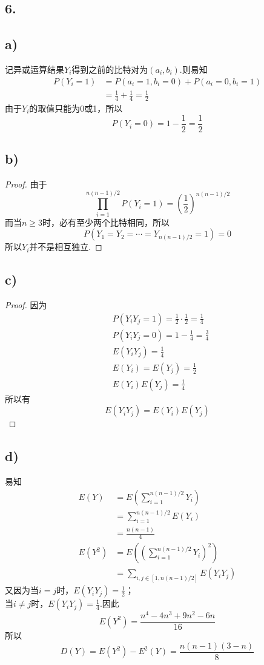 \documentclass[twocolumn]{article}
\begin{document}
\begin{CJK}{UTF8}{gbsn}
			\section*{6.}
			\subsection*{a)}
				记异或运算结果$Y_i$得到之前的比特对为$(a_i,b_i)$.则易知\begin{align*}
					P(Y_i=1) & = P(a_i=1,b_i=0)+P(a_i=0,b_i=1)\\
					& = \frac{1}{4}+\frac{1}{4}=\frac{1}{2}
				\end{align*}
				由于$Y_i$的取值只能为0或1，所以\[P(Y_i=0)=1-\frac{1}{2}=\frac{1}{2} \]
			\subsection*{b)}
				\begin{proof}
					由于\[\prod_{i=1}^{n(n-1)/2}P(Y_i=1)=(\frac{1}{2})^{n(n-1)/2}\]而当$n\ge3$时，必有至少两个比特相同，所以\[P(Y_1=Y_2=\cdots=Y_{n(n-1)/2}=1)=0\]所以$Y_i$并不是相互独立.
				\end{proof}
			\subsection*{c)}
				\begin{proof}
					因为\begin{align*}
						& P(Y_iY_j=1)=\frac{1}{2}\cdot\frac{1}{2}=\frac{1}{4}\\
						& P(Y_iY_j=0)=1-\frac{1}{4}=\frac{3}{4}\\
						& E(Y_iY_j)=\frac{1}{4}\\
						& E(Y_i)=E(Y_j)=\frac{1}{2}\\
						& E(Y_i)E(Y_j)=\frac{1}{4}
					\end{align*}
					所以有\[E(Y_iY_j)=E(Y_i)E(Y_j)\]
				\end{proof}
			\subsection*{d)}
				易知\begin{align*}
					E(Y) & = E(\sum_{i=1}^{n(n-1)/2}Y_i) \\
					& = \sum_{i=1}^{n(n-1)/2}E(Y_i)\\
					& = \frac{n(n-1)}{4}\\
					E(Y^2) & = E((\sum_{i=1}^{n(n-1)/2}Y_i)^2)\\
					& = \sum_{i,j\in[1,n(n-1)/2]}E(Y_iY_j)
				\end{align*}
				又因为当$i=j$时，$E(Y_iY_j)=\frac{1}{2}$；\\当$i\neq j$时，$E(Y_iY_j)=\frac{1}{4}$.因此\[E(Y^2)=\frac{n^4-4n^3+9n^2-6n}{16}\]所以\[D(Y)=E(Y^2)-E^2(Y)=\frac{n(n-1)(3-n)}{8}\]

\end{CJK}
\end{document}
